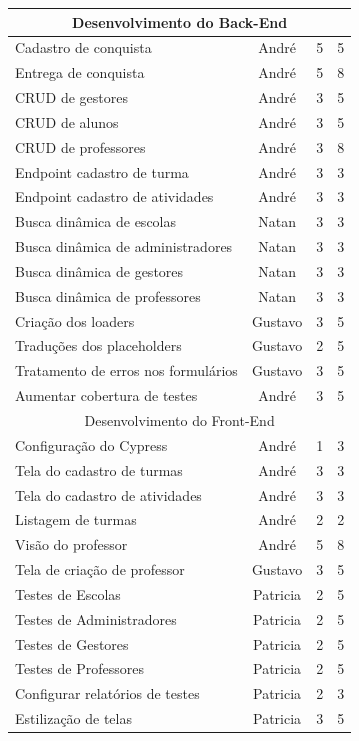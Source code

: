 \begin{apendicesenv}
\begin{quadro}[htb]
\begin{tabular}{|l|c|c|c|}
    \multicolumn{4}{|c|}{Desenvolvimento do Back-End} \\ \hline
    Cadastro de conquista & André    & 5  & 5   \\ \hline  
    Entrega de conquista & André    & 5  & 8   \\ \hline 
    CRUD de gestores & André & 3  & 5    \\ \hline  
    CRUD de alunos & André & 3  & 5    \\ \hline  
    CRUD de professores & André & 3  & 8    \\ \hline 
    Endpoint cadastro de turma & André    & 3  & 3   \\ \hline
    Endpoint cadastro de atividades & André    & 3  & 3   \\ \hline  
    Busca dinâmica de escolas & Natan & 3  & 3   \\ \hline 
    Busca dinâmica de administradores & Natan & 3  & 3   \\ \hline 
    Busca dinâmica de gestores & Natan & 3  & 3   \\ \hline 
    Busca dinâmica de professores & Natan & 3  & 3   \\ \hline
    Criação dos loaders & Gustavo & 3  & 5   \\ \hline 
    Traduções dos placeholders & Gustavo & 2  & 5   \\ \hline 
    Tratamento de erros nos formulários & Gustavo & 3  & 5   \\ \hline 
    Aumentar cobertura de testes & André    & 3  & 5   \\ \hline 
    
    \multicolumn{4}{|c|}{Desenvolvimento do Front-End} \\ \hline
    Configuração do Cypress & André    & 1  & 3   \\ \hline 
    Tela do cadastro de turmas & André & 3  & 3   \\ \hline 
    Tela do cadastro de atividades & André & 3  & 3   \\ \hline
    Listagem de turmas & André & 2  & 2   \\ \hline 
    Visão do professor & André & 5  & 8   \\ \hline 
    Tela de criação de professor & Gustavo & 3  & 5   \\ \hline 
    Testes de Escolas & Patricia & 2  & 5   \\ \hline 
    Testes de Administradores & Patricia & 2  & 5   \\ \hline 
    Testes de Gestores & Patricia & 2  & 5   \\ \hline 
    Testes de Professores & Patricia & 2  & 5   \\ \hline 
    Configurar relatórios de testes & Patricia & 2  & 3   \\ \hline 
    Estilização de telas & Patricia & 3  & 5   \\ \hline 
    

\end{tabular}
\end{quadro}
\end{apendicesenv}
